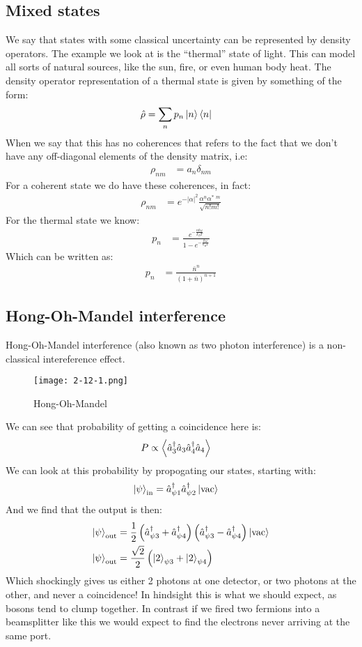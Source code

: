 \subsection{Mixed states}
We say that states with some classical uncertainty can be represented by density operators. The example we look at is the ``thermal'' state of light. This can model all sorts of natural sources, like the sun, fire, or even human body heat.
The density operator representation of a thermal state is given by something of the form:
\begin{align*}
	\hat{\rho} &= \sum_n p_n \ket{n}\bra{n}
\end{align*}
When we say that this has no coherences that refers to the fact that we don't have any off-diagonal elements of the density matrix, i.e:
\begin{align*}
	\rho_{nm} &= a_n \delta_{nm}
\end{align*}
For a coherent state we do have these coherences, in fact:
\begin{align*}
	\rho_{nm} &= e^{-|\alpha|^2} \frac{\alpha^n\alpha^*\ ^m}{\sqrt{n!m!}}
\end{align*}
For the thermal state we know:
\begin{align*}
	p_n &= \frac{e^{-\frac{n\hbar\omega}{k_B T}}}{1- e^{-\frac{\hbar\omega}{k_B T}}}
\end{align*}
Which can be written as:
\begin{align*}
	p_n &= \frac{\bar{n}^n}{(1+\bar{n})^{n+1}}
\end{align*}
\subsection{Hong-Oh-Mandel interference}
Hong-Oh-Mandel interference (also known as two photon interference) is a non-classical intereference effect.
\begin{figure*}[h]
	\centering
	\texttt{[image: 2-12-1.png]}
	\caption*{Hong-Oh-Mandel}
\end{figure*}
We can see that probability of getting a  coincidence here is:
\begin{align*}
	P &\propto \expval{\hat{a}^\dagger_3\hat{a}_3\hat{a}^\dagger_4\hat{a}_4}
\end{align*}
We can look at this probability by propogating our states, starting with:
\begin{align*}
	\ket{\psi}_\text{in} &= \hat{a}^\dagger_{\psi1}\hat{a}^\dagger_{\psi2}\ket{\text{vac}}
\end{align*}
And we find that the output is then:
\begin{align*}
	\ket{\psi}_\text{out} &= \frac{1}{2} \left(\hat{a}_{\psi3}^\dagger + \hat{a}_{\psi4}^\dagger\right)\left(\hat{a}_{\psi3}^\dagger - \hat{a}_{\psi4}^\dagger\right)\ket{\text{vac}} \\
	\ket{\psi}_\text{out} &= \frac{\sqrt{2}}{2} \left(\ket{2}_{\psi3} + \ket{2}_{\psi4}\right)
\end{align*}
Which shockingly gives us either 2 photons at one detector, or two photons at the other, and never a coincidence!
In hindsight this is what we should expect, as bosons tend to clump together. In contrast if we fired two fermions into a beamsplitter like this we would expect to find the electrons never arriving at the same port.

